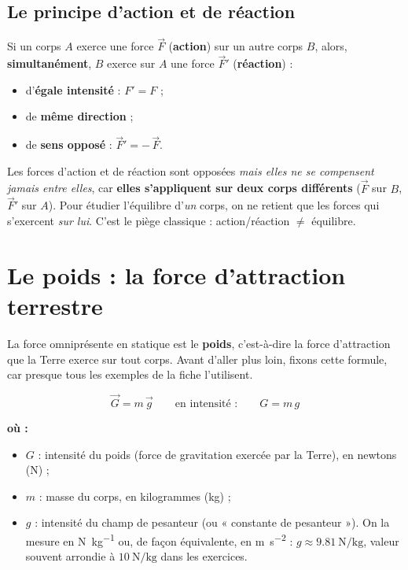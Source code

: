 \documentclass[11pt,a4paper]{article}
\newenvironment{ou}{%
  \par\smallskip\noindent\textbf{où :}\nopagebreak
  \begin{itemize}[leftmargin=1.8em,topsep=2pt,itemsep=1.5pt,parsep=0pt]}%
  {\end{itemize}}
\newcommand{\vv}[1]{\vec{#1}}
\begin{document}
\subsection{Le principe d'action et de réaction}
\begin{theoreme}
Si un corps $A$ exerce une force $\vv F$ (\textbf{action}) sur un autre corps $B$, alors,
\textbf{simultanément}, $B$ exerce sur $A$ une force $\vv F'$ (\textbf{réaction}) :
\begin{itemize}[leftmargin=1.6em,topsep=2pt,itemsep=1pt]
  \item d'\textbf{égale intensité} : $F' = F$ ;
  \item de \textbf{même direction} ;
  \item de \textbf{sens opposé} : $\vv F' = -\,\vv F$.
\end{itemize}
\end{theoreme}

\begin{attention}
Les forces d'action et de réaction sont opposées \emph{mais elles ne se compensent jamais entre
elles}, car \textbf{elles s'appliquent sur deux corps différents} ($\vv F$ sur $B$, $\vv F'$ sur $A$).
Pour étudier l'équilibre d'\emph{un} corps, on ne retient que les forces qui s'exercent
\emph{sur lui}. C'est le piège classique : action/réaction $\neq$ équilibre.
\end{attention}

\section{Le poids : la force d'attraction terrestre}
La force omniprésente en statique est le \textbf{poids}, c'est-à-dire la force d'attraction que la
Terre exerce sur tout corps. Avant d'aller plus loin, fixons cette formule, car presque tous les
exemples de la fiche l'utilisent.

\begin{formule}
\[
\boxed{\;\vv G = m\,\vv g \qquad\text{en intensité :}\qquad G = m\,g\;}
\]
\begin{ou}
  \item $G$ : intensité du poids (force de gravitation exercée par la Terre), en newtons (\si{\newton}) ;
  \item $m$ : masse du corps, en kilogrammes (\si{\kilogram}) ;
  \item $g$ : intensité du champ de pesanteur (ou « constante de pesanteur »).
        On la mesure en \si{\newton\per\kilogram} ou, de façon équivalente, en
        \si{\metre\per\second\squared} : $g \approx \SI{9.81}{\newton\per\kilogram}$, valeur
        souvent arrondie à $\SI{10}{\newton\per\kilogram}$ dans les exercices.
\end{ou}
\end{formule}
\end{document}
